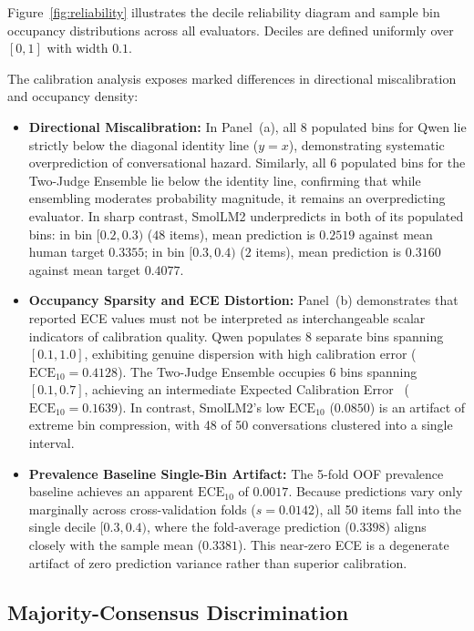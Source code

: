 Figure~\ref{fig:reliability} illustrates the decile reliability diagram and sample bin occupancy distributions across all evaluators. Deciles are defined uniformly over $[0, 1]$ with width $0.1$.

The calibration analysis exposes marked differences in directional miscalibration and occupancy density:
\begin{itemize}
    \item \textbf{Directional Miscalibration:} In Panel~(a), all 8 populated bins for Qwen lie strictly below the diagonal identity line ($y=x$), demonstrating systematic overprediction of conversational hazard. Similarly, all 6 populated bins for the Two-Judge Ensemble lie below the identity line, confirming that while ensembling moderates probability magnitude, it remains an overpredicting evaluator. In sharp contrast, SmolLM2 underpredicts in both of its populated bins: in bin $[0.2, 0.3)$ ($48$ items), mean prediction is $0.2519$ against mean human target $0.3355$; in bin $[0.3, 0.4)$ ($2$ items), mean prediction is $0.3160$ against mean target $0.4077$.
    \item \textbf{Occupancy Sparsity and ECE Distortion:} Panel~(b) demonstrates that reported ECE values must not be interpreted as interchangeable scalar indicators of calibration quality. Qwen populates 8 separate bins spanning $[0.1, 1.0]$, exhibiting genuine dispersion with high calibration error ($\text{ECE}_{10}=0.4128$). The Two-Judge Ensemble occupies 6 bins spanning $[0.1, 0.7]$, achieving an intermediate Expected Calibration Error~\cite{guo2017calibration} ($\text{ECE}_{10}=0.1639$). In contrast, SmolLM2's low $\text{ECE}_{10}$ ($0.0850$) is an artifact of extreme bin compression, with 48 of 50 conversations clustered into a single interval.
    \item \textbf{Prevalence Baseline Single-Bin Artifact:} The 5-fold OOF prevalence baseline achieves an apparent $\text{ECE}_{10}$ of $0.0017$. Because predictions vary only marginally across cross-validation folds ($s=0.0142$), all 50 items fall into the single decile $[0.3, 0.4)$, where the fold-average prediction ($0.3398$) aligns closely with the sample mean ($0.3381$). This near-zero ECE is a degenerate artifact of zero prediction variance rather than superior calibration.
\end{itemize}

\subsection{Majority-Consensus Discrimination}
\label{subsec:discrimination}

